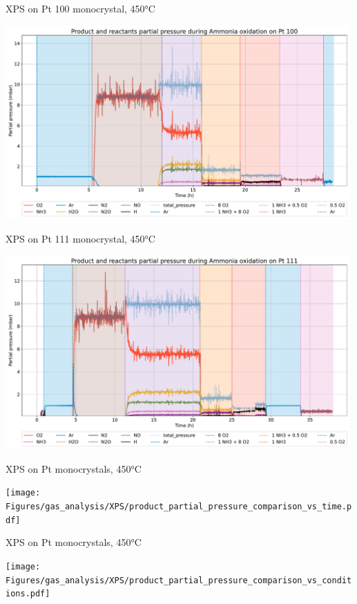 \begin{frame}{XPS on Pt 100 monocrystal, 450°C}

	\includegraphics[width=0.99\textwidth]{Figures/gas_analysis/XPS/pt_100_total_pressure_norm.pdf}

\end{frame}

\begin{frame}{XPS on Pt 111 monocrystal, 450°C}

	\includegraphics[width=0.99\textwidth]{Figures/gas_analysis/XPS/pt_111_total_pressure_norm.pdf}

\end{frame}

\begin{frame}{XPS on Pt monocrystals, 450°C}

	\texttt{[image: Figures/gas\_analysis/XPS/product\_partial\_pressure\_comparison\_vs\_time.pdf]}

\end{frame}

\begin{frame}{XPS on Pt monocrystals, 450°C}

	\texttt{[image: Figures/gas\_analysis/XPS/product\_partial\_pressure\_comparison\_vs\_conditions.pdf]}

\end{frame}